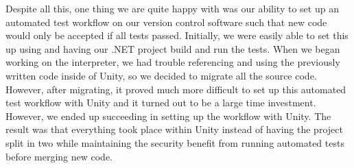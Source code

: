 Despite all this, one thing we are quite happy with was our ability to set up an automated test workflow on our version control software such that new code would only be accepted if all tests passed.
Initially, we were easily able to set this up using and having our .NET project build and run the tests.
When we began working on the interpreter, we had trouble referencing and using the previously written code inside of Unity, so we decided to migrate all the source code.
However, after migrating, it proved much more difficult to set up this automated test workflow with Unity and it turned out to be a large time investment.
However, we ended up succeeding in setting up the workflow with Unity.
The result was that everything took place within Unity instead of having the project split in two while maintaining the security benefit from running automated tests before merging new code.
